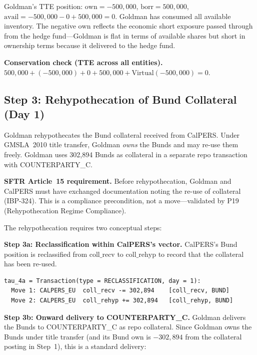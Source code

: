\documentclass[11pt,a4paper]{article}
\begin{document}
\noindent Goldman's TTE position: $\mathrm{own} = -500{,}000$, $\mathrm{borr} = 500{,}000$, $\mathrm{avail} = -500{,}000 - 0 + 500{,}000 = 0$. Goldman has consumed all available inventory. The negative $\mathrm{own}$ reflects the economic short exposure passed through from the hedge fund---Goldman is flat in terms of available shares but short in ownership terms because it delivered to the hedge fund.

\noindent\textbf{Conservation check (TTE across all entities).} $500{,}000 + (-500{,}000) + 0 + 500{,}000 + \text{Virtual}(-500{,}000) = 0$. \checkmark

\subsection{Step 3: Rehypothecation of Bund Collateral (Day 1)}
\label{sec:eu-step3}

Goldman rehypothecates the Bund collateral received from CalPERS. Under GMSLA~2010 title transfer, Goldman \emph{owns} the Bunds and may re-use them freely. Goldman uses 302{,}894 Bunds as collateral in a separate repo transaction with COUNTERPARTY\_C.

\medskip
\noindent\textbf{SFTR Article~15 requirement.} Before rehypothecation, Goldman and CalPERS must have exchanged documentation noting the re-use of collateral (IBP-324). This is a compliance precondition, not a move---validated by P19 (Rehypothecation Regime Compliance).

\medskip
\noindent The rehypothecation requires two conceptual steps:

\noindent\textbf{Step 3a: Reclassification within CalPERS's vector.} CalPERS's Bund position is reclassified from $\mathrm{coll\_recv}$ to $\mathrm{coll\_rehyp}$ to record that the collateral has been re-used.

\begin{lstlisting}
tau_4a = Transaction(type = RECLASSIFICATION, day = 1):
  Move 1: CALPERS_EU  coll_recv -= 302,894    [coll_recv, BUND]
  Move 2: CALPERS_EU  coll_rehyp += 302,894   [coll_rehyp, BUND]
\end{lstlisting}

\noindent\textbf{Step 3b: Onward delivery to COUNTERPARTY\_C.} Goldman delivers the Bunds to COUNTERPARTY\_C as repo collateral. Since Goldman owns the Bunds under title transfer (and its Bund $\mathrm{own}$ is $-302{,}894$ from the collateral posting in Step~1), this is a standard delivery:
\end{document}
